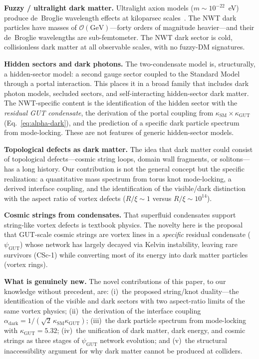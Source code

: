 \documentclass[11pt]{article}
\begin{document}
\textbf{Fuzzy / ultralight dark matter.}
Ultralight axion models ($m \sim 10^{-22}$~eV) produce de~Broglie wavelength effects at kiloparsec scales~\cite{Hui2017}.
The NWT dark particles have masses of $\mathcal{O}(\text{GeV})$---forty orders of magnitude heavier---and their de~Broglie wavelengths are sub-femtometer.
The NWT dark sector is cold, collisionless dark matter at all observable scales, with no fuzzy-DM signatures.

\textbf{Hidden sectors and dark photons.}
The two-condensate model is, structurally, a hidden-sector model: a second gauge sector coupled to the Standard Model through a portal interaction.
This places it in a broad family that includes dark photon models, secluded sectors, and self-interacting hidden-sector dark matter.
The NWT-specific content is the identification of the hidden sector with the \emph{residual GUT condensate}, the derivation of the portal coupling from $\kappa_\text{SM} \times \kappa_\text{GUT}$ (Eq.~\ref{eq:alpha-dark}), and the prediction of a specific dark particle spectrum from mode-locking.
These are not features of generic hidden-sector models.

\textbf{Topological defects as dark matter.}
The idea that dark matter could consist of topological defects---cosmic string loops, domain wall fragments, or solitons---has a long history.
Our contribution is not the general concept but the specific realization: a quantitative mass spectrum from torus knot mode-locking, a derived interface coupling, and the identification of the visible/dark distinction with the aspect ratio of vortex defects ($R/\xi \sim 1$ versus $R/\xi \sim 10^{14}$).

\textbf{Cosmic strings from condensates.}
That superfluid condensates support string-like vortex defects is textbook physics.
The novelty here is the proposal that GUT-scale cosmic strings are vortex lines in a \emph{specific} residual condensate ($\psi_\text{GUT}$) whose network has largely decayed via Kelvin instability, leaving rare survivors (CSc-1) while converting most of its energy into dark matter particles (vortex rings).

\textbf{What is genuinely new.}
The novel contributions of this paper, to our knowledge without precedent, are:
(i)~the proposed string/knot duality---the identification of the visible and dark sectors with two aspect-ratio limits of the same vortex physics;
(ii)~the derivation of the interface coupling $\alpha_\text{dark} = 1/(\sqrt{2}\,\kappa_\text{SM}\kappa_\text{GUT})$;
(iii)~the dark particle spectrum from mode-locking with $\kappa_\text{GUT} = 5.32$;
(iv)~the unification of dark matter, dark energy, and cosmic strings as three stages of $\psi_\text{GUT}$ network evolution;
and (v)~the structural inaccessibility argument for why dark matter cannot be produced at colliders.
\end{document}
